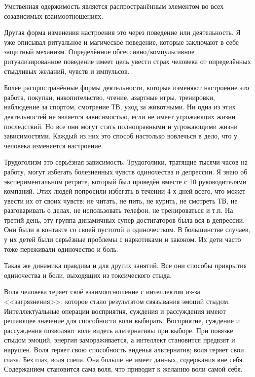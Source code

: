 \documentclass[10pt, fleqn]{article}
\begin{document}
Умственная одержимость является распространённым элементом во всех созависимых взаимоотношениях.


Другая форма изменения настроения это через поведение или деятельность. Я уже описывал ритуальное и магическое поведение, которые заключают в себе защитный механизм. Определённое обсессивно/компульсивное ритуализированное поведение имеет цель увести страх человека от определённых стыдливых желаний, чувств и импульсов.

Более распространённые формы деятельности, которые изменяют настроение это работа, покупки, накопительство, чтение, азартные игры, тренировки, наблюдение за спортом, смотрение ТВ, уход за животными. Ни одна из этих деятельностей не является зависимостью, если не имеет угрожающих жизни последствий. Но все они могут стать полноправными и угрожающими жизни зависимостями. Каждый из них это способ настолько вовлечься в дело, что у человека изменяется настроение.

Трудоголизм это серьёзная зависимость. Трудоголики, тратящие тысячи часов на работу, могут избегать болезненных чувств одиночества и депрессии. Я знаю об экспериментальном ретрите, который был проведён вместе с 10 руководителями компаний. Этих людей попросили избегать в течении 4-х дней всего, что может увести их от своих чувств: не читать, не пить, не курить, не смотреть ТВ, не разговаривать о делах, не использовать телефон, не тренироваться и т.п. На третий день, эту группа динамичных супер-достигаторов была вся в депрессии. Они были в контакте со своей пустотой и одиночеством. В большинстве случаев, у их детей были серьёзные проблемы с наркотиками и законом. Их дети часто тоже переживали одиночество и боль.

Такая же динамика правдива и для других занятий. Все они способы прикрытия одиночества и боли, выходящих из токсического стыда.


Воля человека теряет своё взаимоотношение с интеллектом из-за <<загрязнения>>, которое стало результатом связывания эмоций стыдом.
Интеллектуальные операции восприятия, суждения и рассуждения имеют решающее значение для способности воли выбирать. Восприятие, суждение и рассуждения позволяют воле видеть альтернативы при выборе. При повязке стыдом эмоций, энергия замораживается, а интеллект становится предвзят и нарушен. Воля теряет свою способность виденья альтернатив; воля теряет свои глаза. Без глаз, воля слепа. Она больше не имеет данных, содержания вне себя. Содержанием становится сама воля, что приводит к желанию воли самой себя.
\end{document}
